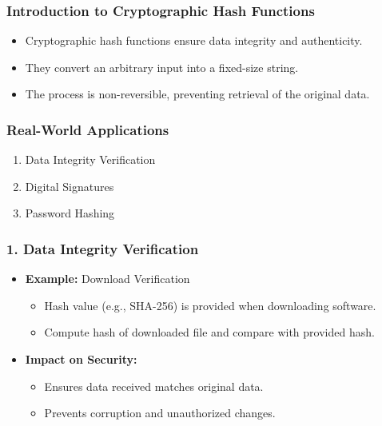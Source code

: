 \documentclass{beamer}
\begin{document}
\begin{frame}
    \frametitle{Introduction to Cryptographic Hash Functions}
    \begin{itemize}
        \item Cryptographic hash functions ensure data integrity and authenticity.
        \item They convert an arbitrary input into a fixed-size string.
        \item The process is non-reversible, preventing retrieval of the original data.
    \end{itemize}
\end{frame}

\begin{frame}
    \frametitle{Real-World Applications}
    \begin{enumerate}
        \item Data Integrity Verification
        \item Digital Signatures
        \item Password Hashing
    \end{enumerate}
\end{frame}

\begin{frame}[fragile]
    \frametitle{1. Data Integrity Verification}
    \begin{itemize}
        \item \textbf{Example:} Download Verification
        \begin{itemize}
            \item Hash value (e.g., SHA-256) is provided when downloading software.
            \item Compute hash of downloaded file and compare with provided hash.
        \end{itemize}
        \item \textbf{Impact on Security:} 
        \begin{itemize}
            \item Ensures data received matches original data.
            \item Prevents corruption and unauthorized changes.
        \end{itemize}
    \end{itemize}
\end{frame}
\end{document}
